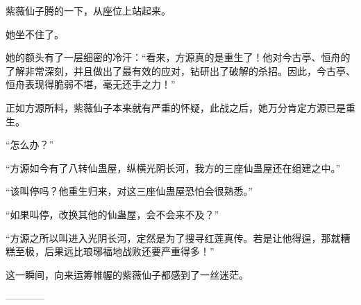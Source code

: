 \begin{this_body}
紫薇仙子腾的一下，从座位上站起来。

她坐不住了。

她的额头有了一层细密的冷汗：“看来，方源真的是重生了！他对今古亭、恒舟的了解非常深刻，并且做出了最有效的应对，钻研出了破解的杀招。因此，今古亭、恒舟表现得脆弱不堪，毫无还手之力！”

正如方源所料，紫薇仙子本来就有严重的怀疑，此战之后，她万分肯定方源已是重生。

“怎么办？”

“方源如今有了八转仙蛊屋，纵横光阴长河，我方的三座仙蛊屋还在组建之中。”

“该叫停吗？他重生归来，对这三座仙蛊屋恐怕会很熟悉。”

“如果叫停，改换其他的仙蛊屋，会不会来不及？”

“方源之所以叫进入光阴长河，定然是为了搜寻红莲真传。若是让他得逞，那就糟糕至极，后果远比琅琊福地战败还要严重得多！”

这一瞬间，向来运筹帷幄的紫薇仙子都感到了一丝迷茫。

------------

\end{this_body}

